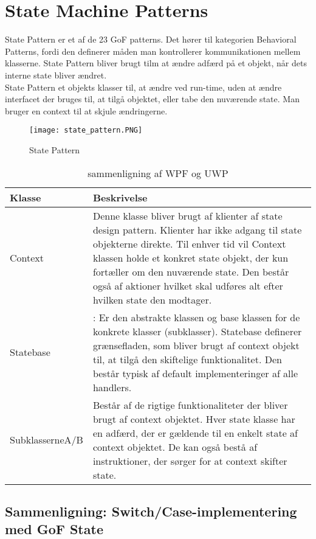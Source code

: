 \documentclass[../SWD_disp.tex]{subfiles}
\begin{document}
\section{State Machine Patterns}
State Pattern er et af de 23 GoF patterns. Det hører til kategorien Behavioral Patterns, fordi den definerer måden man kontrollerer kommunikationen mellem klasserne. State Pattern bliver brugt tilm at ændre adfærd på et objekt, når dets interne state bliver ændret.
\\

State Pattern et objekts klasser til, at ændre ved run-time, uden at ændre interfacet der bruges til, at tilgå objektet, eller tabe den nuværende state. Man bruger en context til at skjule ændringerne.

\begin{figure}[H]
    \centering
    \texttt{[image: state\_pattern.PNG]}
    \caption{State Pattern}
    \label{fig:state_pattern}
\end{figure}

\begin{table}[H]
    \centering
    \begin{tabular}{l|p{}}
        Klasse          & Beskrivelse        \\ \toprule
        Context                & Denne klasse bliver brugt af klienter af state design pattern. Klienter har ikke adgang til state objekterne direkte. Til enhver tid vil Context klassen holde et konkret state objekt, der kun fortæller om den nuværende state. Den består også af aktioner hvilket skal udføres alt efter hvilken state den modtager.    \\ \midrule
        Statebase &: Er den abstrakte klassen og base klassen for de konkrete klasser (subklasser). Statebase definerer grænsefladen, som bliver brugt af context objekt til, at tilgå den skiftelige funktionalitet. Den består typisk af default implementeringer af alle handlers.        \\ \midrule
        SubklasserneA/B    & Består af de rigtige funktionaliteter der bliver brugt af context objektet. Hver state klasse har en adfærd, der er gældende til en enkelt state af context objektet. De kan også bestå af instruktioner, der sørger for at context skifter state. \\ \bottomrule
    \end{tabular}
    \caption{sammenligning af WPF og UWP}\label{tab:wpfVSuwp}
\end{table}

\subsection{Sammenligning: Switch/Case-implementering med GoF State}
\end{document}

